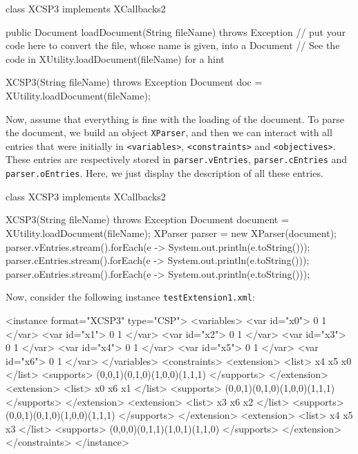 \documentclass[10pt]{article}
\newenvironment{boxabsc}
               {\medskip \begin{bclogo}[barre=none,arrondi=0.2,logo=]{}\vspace{-0.6cm}}
               {\vspace{-0.1cm}\end{bclogo} \smallskip}
\newcommand{\xml}[1]{{\tt <#1>}} %
\newcommand{\nn}[1]{{\tt #1}} %
\begin{document}
\begin{boxabsc}
\begin{absc}
class XCSP3 implements XCallbacks2 { 
  public Document loadDocument(String fileName) throws Exception {
    // put your code here to convert the file, whose name is given, into a Document
    // See the code in XUtility.loadDocument(fileName) for a hint
  }

  XCSP3(String fileName) throws Exception {
    Document doc = XUtility.loadDocument(fileName);
  }
}  
\end{absc} 
\end{boxabsc}

Now, assume that everything is fine with the loading of the document.
To parse the document, we build an object \nn{XParser}, and then we can interact with all entries that were initially in \xml{variables}, \xml{constraints} and \xml{objectives}.
These entries are respectively stored in \nn{parser.vEntries}, \nn{parser.cEntries} and \nn{parser.oEntries}.
Here, we just display the description of all these entries.

\begin{boxabsc}
\begin{absc}
class XCSP3 implements XCallbacks2 { 

  XCSP3(String fileName) throws Exception {
    Document document = XUtility.loadDocument(fileName);
    XParser parser = new XParser(document);
    parser.vEntries.stream().forEach(e -> System.out.println(e.toString()));
    parser.cEntries.stream().forEach(e -> System.out.println(e.toString()));
    parser.oEntries.stream().forEach(e -> System.out.println(e.toString()));
  }
}  
\end{absc} 
\end{boxabsc}

Now, consider the following instance \nn{testExtension1.xml}:

\begin{boxabsc}
\begin{absc}
<instance format="XCSP3" type="CSP">
  <variables>
    <var id="x0"> 0 1 </var>
    <var id="x1"> 0 1 </var>
    <var id="x2"> 0 1 </var>
    <var id="x3"> 0 1 </var>
    <var id="x4"> 0 1 </var>
    <var id="x5"> 0 1 </var>
    <var id="x6"> 0 1 </var>
  </variables>
  <constraints>
    <extension>
      <list> x4 x5 x0 </list>
      <supports> (0,0,1)(0,1,0)(1,0,0)(1,1,1) </supports>
    </extension>
    <extension>
      <list> x0 x6 x1 </list>
      <supports> (0,0,1)(0,1,0)(1,0,0)(1,1,1) </supports>
    </extension>
    <extension>
      <list> x3 x6 x2 </list>
      <supports> (0,0,1)(0,1,0)(1,0,0)(1,1,1) </supports>
    </extension>
    <extension>
      <list> x4 x5 x3 </list>
      <supports> (0,0,0)(0,1,1)(1,0,1)(1,1,0) </supports>
    </extension>
  </constraints>
</instance>
\end{absc} 
\end{boxabsc}
\end{document}
